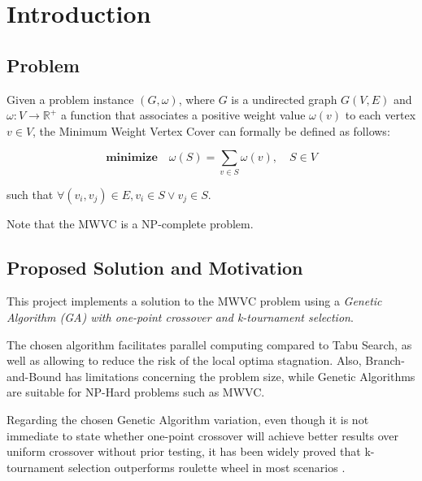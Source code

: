 \chapter{Introduction}

\section{Problem}

Given a problem instance $(G, \omega)$, where $G$ is a undirected graph $G(V, E)$ and $\omega: V \to \mathbb{R}^{+}$ a function that associates a positive weight value $\omega(v)$ to each vertex $v \in V$, the Minimum Weight Vertex Cover can formally be defined as follows:

\[ \textbf{minimize} \quad \omega(S) = \sum_{v \in S} \omega(v), \quad S \in V \]

{
	\centering
	such that $\forall (v_i, v_j) \in E, v_i \in S \lor v_j \in S$.
}

Note that the MWVC is a NP-complete problem.

\section{Proposed Solution and Motivation}

This project implements a solution to the MWVC problem using a \emph{Genetic Algorithm (GA) with one-point crossover and k-tournament selection}.
\par
The chosen algorithm facilitates parallel computing compared to Tabu Search, as well as allowing to reduce the risk of the local optima stagnation. Also, Branch-and-Bound has limitations concerning the problem size, while Genetic Algorithms are suitable for NP-Hard problems such as MWVC.
\par
Regarding the chosen Genetic Algorithm variation, even though it is not immediate to state whether one-point crossover will achieve better results over uniform crossover without prior testing, it has been widely proved that k-tournament selection outperforms roulette wheel in most scenarios \cite{ktournament-vs-wheeler}.
